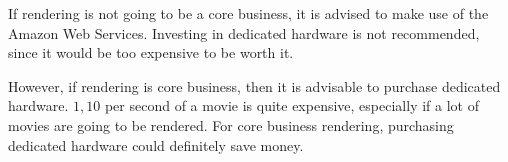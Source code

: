 If rendering is not going to be a core business, it is advised to make use of the Amazon Web Services.
Investing in dedicated hardware is not recommended, since it would be too expensive to be worth it.

However, if rendering is core business, then it is advisable to purchase dedicated hardware.
\EUR$1,10$ per second of a movie is quite expensive, especially if a lot of movies are going to be rendered.
For core business rendering, purchasing dedicated hardware could definitely save money.